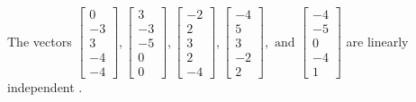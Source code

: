 \begin{exercise}
\begin{exerciseStatement}
  \end{exerciseStatement}
  \begin{exerciseAnswer}
   The vectors \(\left[\begin{array}{r}
0 \\
-3 \\
3 \\
-4 \\
-4
\end{array}\right] , \left[\begin{array}{r}
3 \\
-3 \\
-5 \\
0 \\
0
\end{array}\right] , \left[\begin{array}{r}
-2 \\
2 \\
3 \\
2 \\
-4
\end{array}\right] , \left[\begin{array}{r}
-4 \\
5 \\
3 \\
-2 \\
2
\end{array}\right] , \text{ and } \left[\begin{array}{r}
-4 \\
-5 \\
0 \\
-4 \\
1
\end{array}\right]\) are 
  	 linearly independent  .
  


  \end{exerciseAnswer}
\end{exercise}